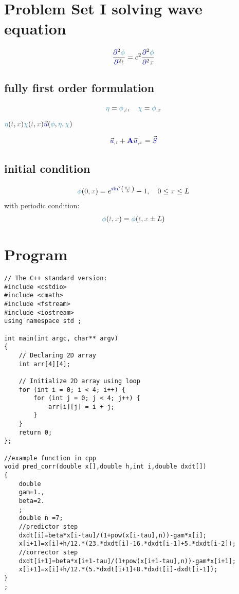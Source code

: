 \documentclass[10pt,fleqn,reqno,a4paper]{article}
\begin{document}
\section{Problem Set I solving wave equation}

\begin{align}
	\frac{\opartial^2\nphi}{\opartial^2\ct} = c^2\frac{\opartial^2\nphi}{\opartial^2\cx}
\end{align}

\subsection{fully first order formulation}

\begin{align}
	\neta = \nphi_{,\ct}, \quad \nchi = \nphi_{,\cx}
\end{align}



$ \neta(\ct,\cx) \nchi(\ct,\cx) \vfu(\nphi,\neta,\nchi) $


\begin{align}
	\vfu_{,\ct}+\MA\vfu_{,\cx}=\vfS
\end{align}



\subsection{initial condition}

\begin{align}
	\nphi(0, \cx)=e^{\fsin^2\left(\frac{\pi \cx}{L}\right)} -1, \quad 0 \leq \cx \leq L
\end{align}
with periodic condition:
\begin{align}
	\nphi(\ct,\cx) = \nphi(\ct, \cx \pm L)
\end{align}


\section{Program}
\begin{verbatim}
// The C++ standard version:
#include <cstdio>
#include <cmath>
#include <fstream>
#include <iostream>
using namespace std ;

int main(int argc, char** argv)
{
	// Declaring 2D array
	int arr[4][4];

	// Initialize 2D array using loop
	for (int i = 0; i < 4; i++) {
		for (int j = 0; j < 4; j++) {
			arr[i][j] = i + j;
		}
	}
	return 0;
};

//example function in cpp
void pred_corr(double x[],double h,int i,double dxdt[])
{
	double
	gam=1.,
	beta=2.
	;
	double n =7;
	//predictor step
	dxdt[i]=beta*x[i-tau]/(1+pow(x[i-tau],n))-gam*x[i];
	x[i+1]=x[i]+h/12.*(23.*dxdt[i]-16.*dxdt[i-1]+5.*dxdt[i-2]);
	//corrector step
	dxdt[i+1]=beta*x[i+1-tau]/(1+pow(x[i+1-tau],n))-gam*x[i+1];
	x[i+1]=x[i]+h/12.*(5.*dxdt[i+1]+8.*dxdt[i]-dxdt[i-1]);
}
;
\end{verbatim}
\end{document}
